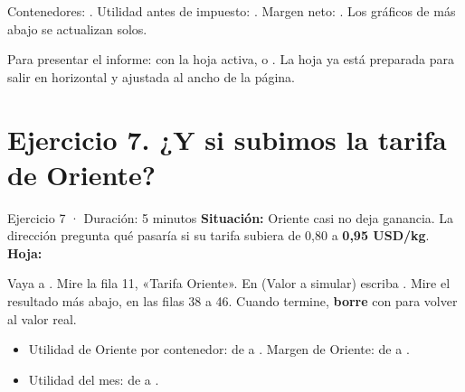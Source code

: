 
\begin{resultado}
Contenedores: \textbf{\vEjSeisCont}. Utilidad antes de impuesto: \textbf{\vEjSeisUAI}. Margen neto: \textbf{\vEjSeisMargen}.
Los gráficos de más abajo se actualizan solos.
\end{resultado}

\begin{consejo}
Para presentar el informe:  con la hoja  activa, o . La hoja ya está preparada para salir en horizontal y ajustada al ancho de la página.
\end{consejo}

\section{Ejercicio 7. ¿Y si subimos la tarifa de Oriente?}

\begin{ficha}{Ejercicio 7 · Duración: 5 minutos}
\textbf{Situación:} Oriente casi no deja ganancia. La dirección pregunta qué pasaría si su tarifa subiera de 0,80 a \textbf{0,95 USD/kg}.\\
\textbf{Hoja:} 
\end{ficha}

\begin{pasos}
\paso Vaya a . Mire la fila 11, «Tarifa Oriente».
\paso En  (Valor a simular) escriba .
\paso Mire el resultado más abajo, en las filas 38 a 46.
\paso Cuando termine, \textbf{borre } con  para volver al valor real.
\end{pasos}


\begin{resultado}
\begin{itemize}
  \item Utilidad de Oriente por contenedor: de \vSimUAIori{} a \textbf{\vEjSieteUAIori}. Margen de Oriente: de \vSimMgOri{} a \textbf{\vEjSieteMgOri}.
  \item Utilidad del mes: de \vSimUAImes{} a \textbf{\vEjSieteUAImes}.
\end{itemize}
\end{resultado}


